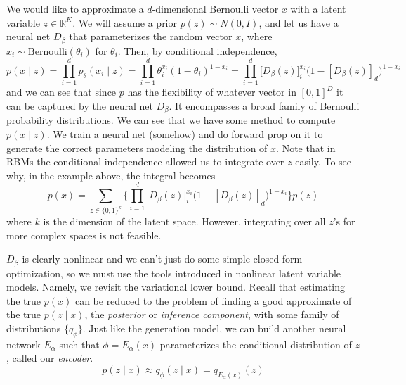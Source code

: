   \begin{example} 
    We would like to approximate a $d$-dimensional Bernoulli vector $x$ with a latent variable $z \in \mathbb{R}^K$. We will assume a prior $p(z) \sim N(0, I)$, and let us have a neural net $D_{\beta}$ that parameterizes the random vector $x$, where $x_i \sim \mathrm{Bernoulli}(\theta_i)$ for $\theta_i$. Then, by conditional independence, 
    \begin{equation}
      p(x \mid z) = \prod_{i=1}^d p_\theta (x_i \mid z) = \prod_{i=1}^d \theta_i^{x_i} (1 - \theta_i)^{1 - x_i} = \prod_{i=1}^d \big[ D_\beta(z) \big]_i^{x_i} \big( 1 - [D_\beta(z)]_d \big)^{1 - x_i}
    \end{equation}
    and we can see that since $p$ has the flexibility of whatever vector in $[0, 1]^D$ it can be captured by the neural net $D_\beta$. It encompasses a broad family of Bernoulli probability distributions. We can see that we have some method to compute $p(x \mid z)$. We train a neural net (somehow) and do forward prop on it to generate the correct parameters modeling the distribution of $x$. Note that in RBMs the conditional independence allowed us to integrate over $z$ easily. To see why, in the example above, the integral becomes
    \begin{equation}
      p(x) = \sum_{z \in \{0, 1\}^k} \bigg\{ \prod_{i=1}^d \big[ D_\beta(z) \big]_i^{x_i} \big( 1 - [D_\beta(z)]_d \big)^{1 - x_i} \bigg\} p(z) 
    \end{equation}
    where $k$ is the dimension of the latent space. However, integrating over all $z$'s for more complex spaces is not feasible. 
  \end{example}

  $D_\beta$ is clearly nonlinear and we can't just do some simple closed form optimization, so we must use the tools introduced in nonlinear latent variable models. Namely, we revisit the variational lower bound. Recall that estimating the true $p(x)$ can be reduced to the problem of finding a good approximate of the true $p(z \mid x)$, the \textit{posterior} or \textit{inference component}, with some family of distributions $\{ q_\phi \}$. Just like the generation model, we can build another neural network $E_{\alpha}$ such that $\phi = E_{\alpha} (x)$ parameterizes the conditional distribution of $z$, called our \textit{encoder}. 
  \begin{equation}
    p(z \mid x) \approx q_\phi (z \mid x) = q_{E_\alpha (x)} (z)
  \end{equation}

